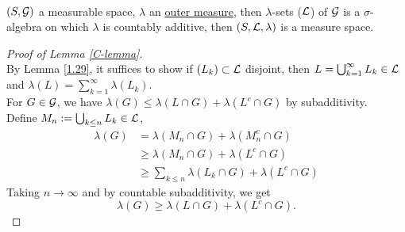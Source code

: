 \begin{lemma}\label{C-lemma}\ \\
$(S,\mathcal{G})$ a measurable space, $\lambda$ an \underline{outer measure}, then $\lambda$-sets ($\mathcal{L}$) of $\mathcal{G}$ is a $\sigma$-algebra on which $\lambda$ is countably additive, then $(S, \mathcal{L}, \lambda)$ is a measure space.
\end{lemma}
\begin{proof}[Proof of Lemma \ref{C-lemma}]\ \\
By Lemma \ref{1.29}, it suffices to show if $(L_k) \subset \mathcal{L}$ disjoint, then $L = \bigcup_{k = 1}^\infty L_k \in \mathcal{L}$ and $\lambda(L) = \sum_{k = 1}^\infty \lambda(L_k)$.\\
For $G \in \mathcal{G}$, we have $\lambda(G) \leq \lambda(L \cap G) + \lambda(L^c \cap G)$ by subadditivity.\\
Define $M_n := \bigcup_{k \leq n} L_k \in \mathcal{L}$,
\begin{align*}
    \lambda(G) &= \lambda(M_n \cap G) + \lambda(M_n^c \cap G)\\
    &\geq \lambda(M_n \cap G) + \lambda(L^c \cap G)\\
    &\geq \sum_{k \leq n} \lambda(L_k \cap G) + \lambda(L^c \cap G)
\end{align*}
Taking $n \to \infty$ and by countable subadditivity, we get
\begin{equation*}
    \lambda(G) \geq \lambda(L \cap G) + \lambda(L^c \cap G).
\end{equation*}
\end{proof}

